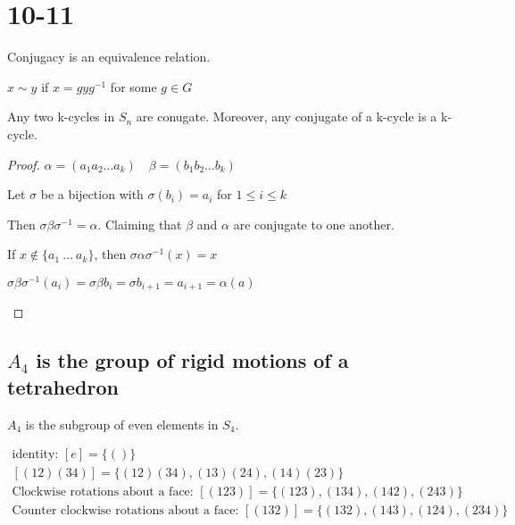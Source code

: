 \documentclass[class=scrartcl, crop=false]{standalone}
\begin{document}
\section{10-11}

\begin{lemma}
  Conjugacy is an equivalence relation.

  $x \sim y$ if $x = gyg^{-1}$ for some $g \in G$
\end{lemma}

\begin{theorem}
  Any two k-cycles in $S_n$ are conugate. Moreover, any conjugate of a k-cycle is a k-cycle.

  \begin{proof}
    $\alpha = (a_1 a_2 \dots a_k) \quad \beta = (b_1 b_2 \dots b_k)$

    Let $\sigma$ be a bijection with $\sigma(b_i) = a_i$ for $1 \leq i \leq k$ 

    Then $\sigma \beta \sigma^{-1} = \alpha$. Claiming that $\beta$ and $\alpha$ are conjugate to one another.

    If $x \notin \{a_1 \ \dots \ a_k\}$, then $\sigma \alpha \sigma^{-1}(x) = x$

    \begin{example}
      $\sigma \beta \sigma^{-1} (a_i) = \sigma \beta b_i = \sigma b_{i + 1} = a_{i + 1} = \alpha (a)$
    \end{example}
  \end{proof}
\end{theorem}

\subsection{$A_4$ is the group of rigid motions of a tetrahedron}

\begin{note}
  $A_4$ is the subgroup of even elements in $S_4$.
\end{note}

\begin{gather*}
  \text{identity: } [e] = \{()\} \\
  [(12)(34)] = \{(12)(34), (13)(24), (14)(23)\} \\
  \text{Clockwise rotations about a face: } [(123)] = \{(123), (134), (142), (243)\} \\
  \text{Counter clockwise rotations about a face: } [(132)] = \{(132), (143), (124), (234)\}
\end{gather*}
\end{document}

